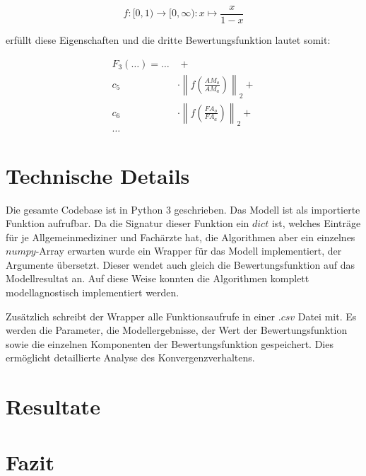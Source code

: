 \documentclass[a4paper,12pt]{article}
\begin{document}
\begin{equation*}
f: [0,1) \rightarrow [0,\infty) : x \mapsto \frac{x}{1-x}
\end{equation*}

erfüllt diese Eigenschaften und die dritte Bewertungsfunktion lautet somit:

\begin{align*}
F_3(\hdots) = \hdots & \hspace{4pt} + \\
			c_5 &\cdot \left\| f\left( \frac{AM_o}{AM_a} \right) \right\|_2 +\\
			c_6 &\cdot \left\| f\left( \frac{FA_o}{FA_a} \right) \right\|_2 +\\
			 \hdots &
\end{align*}


\section{Technische Details}

Die gesamte Codebase ist in Python 3 geschrieben. Das Modell ist als importierte Funktion aufrufbar. Da die Signatur dieser Funktion ein $dict$ ist, welches Einträge für je Allgemeinmediziner und Fachärzte hat, die Algorithmen aber ein einzelnes $numpy$-Array erwarten wurde ein Wrapper für das Modell implementiert, der Argumente übersetzt. Dieser wendet auch gleich die Bewertungsfunktion auf das Modellresultat an. Auf diese Weise konnten die Algorithmen komplett modellagnostisch implementiert werden. 

Zusätzlich schreibt der Wrapper alle Funktionsaufrufe in einer $.csv$ Datei mit. Es werden die Parameter, die Modellergebnisse, der Wert der Bewertungsfunktion sowie die einzelnen Komponenten der Bewertungsfunktion gespeichert. Dies ermöglicht detaillierte Analyse des Konvergenzverhaltens.

\section{Resultate}



\section{Fazit}
\end{document}
